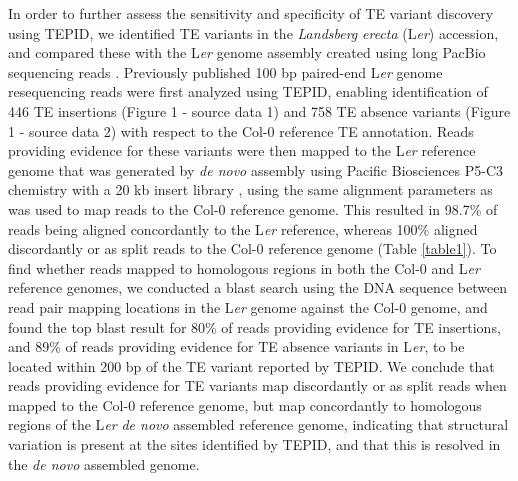 \documentclass[12pt]{article}
\begin{document}
In order to further assess the sensitivity and specificity of TE variant
discovery using TEPID, we identified TE variants in the \emph{Landsberg}
\emph{erecta} (L\emph{er}) accession, and compared these with the
L\emph{er }genome assembly created using long PacBio sequencing reads
\cite{Chin:2013iw}. Previously published 100 bp paired-end L\emph{er}
genome resequencing reads \cite{Schneeberger:2011ft} were first analyzed
using TEPID, enabling identification of 446 TE insertions (Figure 1 -
source data 1) and 758 TE absence variants (Figure 1 - source data 2)
with respect to the Col-0 reference TE annotation. Reads providing
evidence for these variants were then mapped to the L\emph{er} reference
genome that was generated by \emph{de novo} assembly using Pacific
Biosciences P5-C3 chemistry with a 20 kb insert library
\cite{Chin:2013iw}, using the same alignment parameters as was used to
map reads to the Col-0 reference genome. This resulted in 98.7\% of
reads being aligned concordantly to the L\emph{er} reference, whereas
100\% aligned discordantly or as split reads to the Col-0 reference
genome (Table \ref{table1}). To find whether reads mapped to homologous regions in
both the Col-0 and L\emph{er} reference genomes, we conducted a blast
search \cite{Camacho:2009fc} using the DNA sequence between read pair
mapping locations in the L\emph{er }genome against the Col-0 genome, and
found the top blast result for 80\% of reads providing evidence for TE
insertions, and 89\% of reads providing evidence for TE absence variants
in L\emph{er}, to be located within 200 bp of the TE variant
reported by TEPID. We conclude that reads providing evidence for TE
variants map discordantly or as split reads when mapped to the Col-0
reference genome, but map concordantly to homologous regions of the
L\emph{er} \emph{de novo} assembled reference genome, indicating that
structural variation is present at the sites identified by TEPID, and
that this is resolved in the \emph{de novo} assembled genome.
\end{document}
